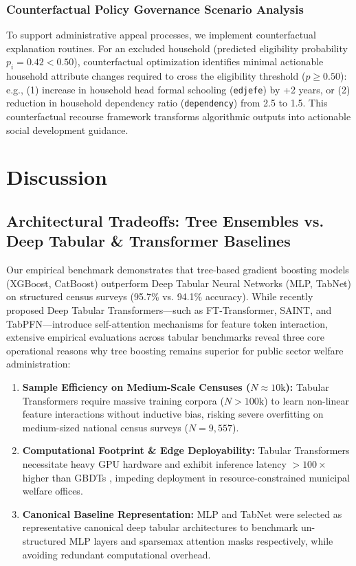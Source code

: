 \documentclass[conference]{IEEEtran}
\begin{document}
\subsubsection{Counterfactual Policy Governance Scenario Analysis}
To support administrative appeal processes, we implement counterfactual explanation routines. For an excluded household (predicted eligibility probability $p_i = 0.42 < 0.50$), counterfactual optimization identifies minimal actionable household attribute changes required to cross the eligibility threshold ($p \ge 0.50$): e.g., (1) increase in household head formal schooling (\texttt{edjefe}) by +2 years, or (2) reduction in household dependency ratio (\texttt{dependency}) from 2.5 to 1.5. This counterfactual recourse framework transforms algorithmic outputs into actionable social development guidance.


\section{Discussion}

\subsection{Architectural Tradeoffs: Tree Ensembles vs. Deep Tabular & Transformer Baselines}
Our empirical benchmark demonstrates that tree-based gradient boosting models (XGBoost, CatBoost) outperform Deep Tabular Neural Networks (MLP, TabNet) on structured census surveys (95.7\% vs. 94.1\% accuracy). While recently proposed Deep Tabular Transformers—such as FT-Transformer, SAINT, and TabPFN—introduce self-attention mechanisms for feature token interaction, extensive empirical evaluations across tabular benchmarks \cite{b_tabular_dl} reveal three core operational reasons why tree boosting remains superior for public sector welfare administration:
\begin{enumerate}
\item \textbf{Sample Efficiency on Medium-Scale Censuses ($N \approx 10\text{k}$):} Tabular Transformers require massive training corpora ($N > 100\text{k}$) to learn non-linear feature interactions without inductive bias, risking severe overfitting on medium-sized national census surveys ($N=9,557$).
\item \textbf{Computational Footprint & Edge Deployability:} Tabular Transformers necessitate heavy GPU hardware and exhibit inference latency $>100\times$ higher than GBDTs \cite{b_tabular_dl}, impeding deployment in resource-constrained municipal welfare offices.
\item \textbf{Canonical Baseline Representation:} MLP and TabNet were selected as representative canonical deep tabular architectures to benchmark un-structured MLP layers and sparsemax attention masks respectively, while avoiding redundant computational overhead.
\end{enumerate}
\end{document}
